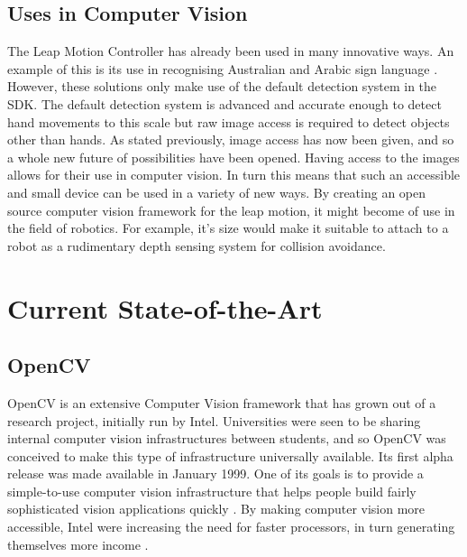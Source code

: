 \documentclass[11pt,oneside]{report}
\begin{document}
			\subsection{Uses in Computer Vision}
				The Leap Motion Controller has already been used in many innovative ways.
				An example of this is its use in recognising Australian and Arabic sign language \cite{journal:leapSignLanguage,journal:leapSignLanguage2}.
				However, these solutions only make use of the default detection system in the SDK.
				The default detection system is advanced and accurate enough to detect hand movements to this scale but raw image access is required to detect objects other than hands.
				As stated previously, image access has now been given, and so a whole new future of possibilities have been opened.
				Having access to the images allows for their use in computer vision.
				In turn this means that such an accessible and small device can be used in a variety of new ways.
				By creating an open source computer vision framework for the leap motion, it might become of use in the field of robotics.
				For example, it's size would make it suitable to attach to a robot as a rudimentary depth sensing system for collision avoidance.
				
			
		\section{Current State-of-the-Art}
		
			\subsection{OpenCV}
				OpenCV is an extensive Computer Vision framework that has grown out of a research project, initially run by Intel.
				Universities were seen to be sharing internal computer vision infrastructures between students, and so OpenCV was conceived to make this type of infrastructure universally available.
				Its first alpha release was made available in January 1999.
				One of its goals is to provide a simple-to-use computer vision infrastructure that helps people build fairly sophisticated vision applications quickly \cite[p. 1]{definition:cv}.	
				By making computer vision more accessible, Intel were increasing the need for faster processors, in turn generating themselves more income \cite{definition:cv}.
				
\end{document}
